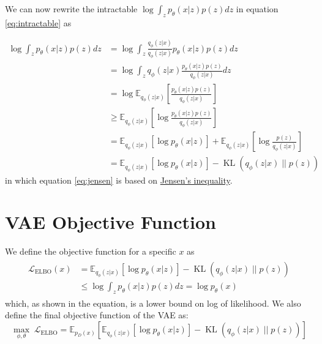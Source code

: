 \documentclass{article}
\newcommand{\kl}[2]{\operatorname{KL}({#1} \; || \; {#2})}
\begin{document}
We can now rewrite the intractable $\log \int_z p_\theta(x|z) p(z) dz$ in equation \ref{eq:intractable} as

\begin{align}
    \log \int_z p_\theta(x|z) p(z) dz &=
    \log \int_z \frac{q_\phi(z|x)}{q_\phi(z|x)} p_\theta(x|z) p(z) dz \\
    &= \log \int_z q_\phi(z|x) \frac{p_\theta(x|z) p(z)}{q_\phi(z|x)} dz \\
    &= \log \mathbb{E}_{q_\phi(z|x)}[\frac{p_\theta(x|z) p(z)}{q_\phi(z|x)}] \\
    &\ge \mathbb{E}_{q_\phi(z|x)}[\log \frac{p_\theta(x|z) p(z)}{q_\phi(z|x)}] \label{eq:jensen}\\
    &= \mathbb{E}_{q_\phi(z|x)}[\log p_\theta(x|z)] + \mathbb{E}_{q_\phi(z|x)}[\log \frac{p(z)}{q_\phi(z|x)}] \\
    &= \mathbb{E}_{q_\phi(z|x)}[\log p_\theta(x|z)] - \kl{q_\phi(z|x)}{p(z)}
\end{align}
in which equation \ref{eq:jensen} is based on \href{https://en.wikipedia.org/wiki/Jensen\%27s_inequality}{Jensen's inequality}.

\section{VAE Objective Function}
We define the objective function for a specific $x$ as
\begin{align}
    \begin{split}
        \mathcal{L}_{\text{ELBO}}(x) &= \mathbb{E}_{q_\phi(z|x)}[\log p_\theta(x|z)] - \kl{q_\phi(z|x)}{p(z)} \\
    &\le \log \int_z p_\theta(x|z) p(z) dz = \log p_\theta(x)
    \end{split}
\end{align}
which, as shown in the equation, is a lower bound on log of likelihood.
We also define the final objective function of the VAE as:
\begin{equation}
    \label{eq:elbo}
    \underset{\phi, \theta}{\max} \; \mathcal{L}_{\text{ELBO}} = \mathbb{E}_{p_D(x)} \left[ \mathbb{E}_{q_\phi(z|x)}[\log p_\theta(x|z)] - \kl{q_\phi(z|x)}{p(z)} \right]
\end{equation}
\end{document}
